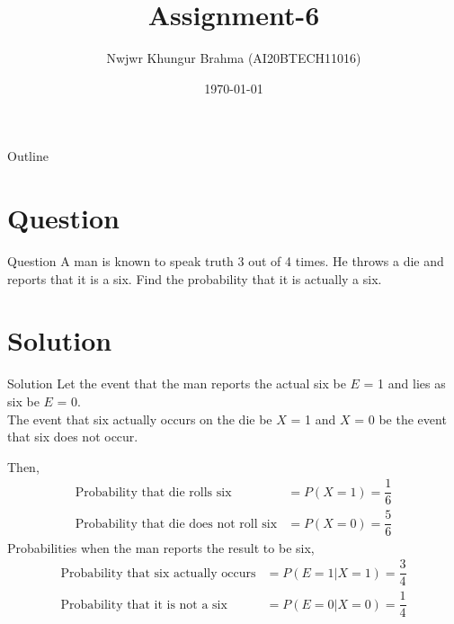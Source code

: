 \documentclass{beamer}
\title{Assignment-6}
\author{Nwjwr Khungur Brahma (AI20BTECH11016)}
\date{\today}
\begin{document}
\begin{frame}
    \titlepage 
\end{frame}


\begin{frame}{Outline}
    \tableofcontents
\end{frame}


\section{Question}
\begin{frame}{Question}
A man is known to speak truth 3 out of 4 times. He throws a die and reports that it is a six. Find the probability that it is actually a six.
\end{frame}

\section{Solution}
\begin{frame}{Solution}
Let the event that the man reports the actual six be $E$ = 1 and lies as six be $E$ = 0.\\The event that six actually occurs on the die be $X$ = 1 and $X$ = 0 be the event that six does not occur.\\
\end{frame}

\begin{frame}
\begin{table}[ht!]
    
    \label{Table 1}
\end{table}
\end{frame}

\begin{frame}
Then,
\begin{align}
\text{Probability that die rolls six}&=P(X=1)=\dfrac{1}{6}\label{eq:1}\\
\text{Probability that die does not roll six}&=P(X=0)=\dfrac{5}{6}\label{eq:2}
\end{align}
Probabilities when the man reports the result to be six,
\begin{align}
\text{Probability that six actually occurs}&=P(E=1|X=1)=\dfrac{3}{4}\label{eq:3}\\
\text{Probability that it is not a six}&=P(E=0|X=0)=\dfrac{1}{4}\label{eq:4}
\end{align}
\end{frame}
\end{document}
